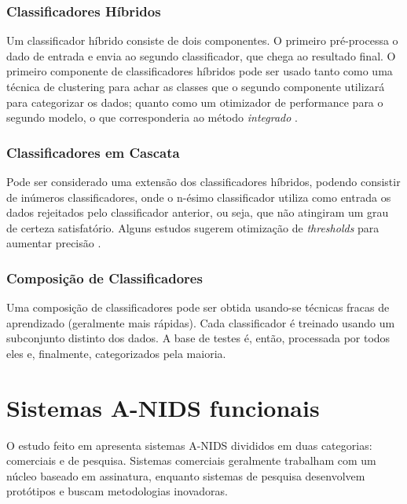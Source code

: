  \subsection{Classificadores Híbridos}
    Um classificador híbrido consiste de dois componentes. O primeiro pré-processa o dado de entrada e envia ao segundo
    classificador, que chega ao resultado final. O primeiro componente de classificadores híbridos pode ser usado tanto
    como uma técnica de clustering para achar as classes que o segundo componente utilizará para categorizar os dados;
    quanto como um otimizador de performance para o segundo modelo, o que corresponderia ao método \textit{integrado}
    \cite{aydin09}.


 \subsection{Classificadores em Cascata}
    Pode ser considerado uma extensão dos classificadores híbridos, podendo consistir de inúmeros classificadores, onde
    o n-ésimo classificador utiliza como entrada os dados rejeitados pelo classificador anterior, ou seja, que não
    atingiram um grau de certeza satisfatório. Alguns estudos sugerem otimização de \emph{thresholds} para aumentar precisão
    \cite{oliveira05}.

 \subsection{Composição de Classificadores}
    Uma composição de classificadores pode ser obtida usando-se técnicas fracas de aprendizado
    (geralmente mais rápidas). Cada classificador é treinado usando um subconjunto distinto dos dados.
    A base de testes é, então, processada por todos eles e, finalmente, categorizados pela maioria.


\chapter{Sistemas A-NIDS funcionais}
    O estudo feito em \cite{teodoro09} apresenta sistemas A-NIDS divididos em duas categorias: comerciais e de pesquisa.
    Sistemas comerciais geralmente trabalham com um núcleo baseado em assinatura, enquanto sistemas de pesquisa
    desenvolvem protótipos e buscam metodologias inovadoras.

